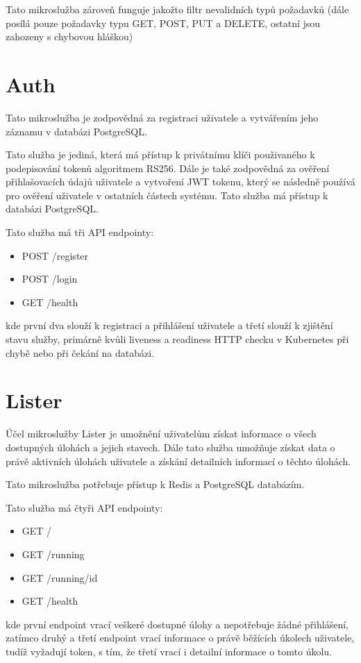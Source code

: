 \documentclass[12pt, a4paper,
oneside,      %
openright
]{report}
\begin{document}
Tato mikroslužba zároveň funguje jakožto filtr nevalidních typů požadavků (dále posílá pouze požadavky typu GET, POST, PUT a DELETE, ostatní jsou zahozeny s chybovou hláškou)

\section{Auth}
Tato mikroslužba je zodpovědná za registraci uživatele a vytvářením jeho záznamu v databázi PostgreSQL. 

Tato služba je jediná, která má přístup k privátnímu klíči použivaného k podepisování tokenů algoritmem RS256. Dále je také zodpovědná za ověření přihlašovacích údajů uživatele a vytvoření JWT tokenu, který se následně používá pro ověření uživatele v ostatních částech systému. Tato služba má přístup k databázi PostgreSQL.

Tato služba má tři API endpointy:
\begin{itemize}
	\item POST /register
	\item POST /login
	\item GET /health
\end{itemize}
kde první dva slouží k registraci a přihlášení uživatele a třetí slouží k zjištění stavu služby, primárně kvůli liveness a readiness HTTP checku v Kubernetes při chybě nebo při čekání na databázi.

\section{Lister}
Účel mikroslužby Lister je umožnění uživatelům získat informace o všech dostupných úlohách a jejich stavech. Dále tato služba umožňuje získat data o právě aktivních úlohách uživatele a získání detailních informací o těchto úlohách.

Tato mikroslužba potřebuje přístup k Redis a PostgreSQL databázím.

Tato služba má čtyři API endpointy:
\begin{itemize}
	\item GET /
	\item GET /running
	\item GET /running/{id}
	\item GET /health
\end{itemize}
kde první endpoint vrací veškeré dostupné úlohy a nepotřebuje žádné přihlášení, zatímco druhý a třetí endpoint vrací informace o právě běžících úkolech uživatele, tudíž vyžadují token, s tím, že třetí vrací i detailní informace o tomto úkolu.
\end{document}
